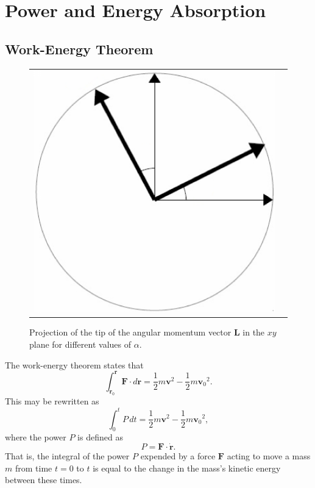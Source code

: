 \documentclass[twocolumn,showpacs,preprintnumbers,amsmath,amssymb]{revtex4}
\begin{document}
\section{Power and Energy Absorption}

\subsection{Work-Energy Theorem}

\begin{figure}
 \centering
 \begin{tabular}{cc}
  \includegraphics[page=6]{rydberg_version2_graphics.pdf}
\end{tabular}
 \label{figur} \caption{Projection of the tip of the angular momentum vector $\mathbf L$ in the $xy$ plane for different values of $\alpha$.}
\end{figure}

The work-energy theorem states that
\begin{equation}
\int_{\mathbf r_0}^{\mathbf r} \mathbf F\cdot d\mathbf r = \frac{1}{2}m{\mathbf v}^2 - \frac{1}{2}m{\mathbf v_0}^2.
\end{equation}
This may be rewritten as
\begin{equation}
\label{eq:int F.v dt}
\int_0^t P\,dt = \frac{1}{2}m{\mathbf v}^2 - \frac{1}{2}m{\mathbf v_0}^2,
\end{equation}
where the power $P$ is defined as
\begin{equation}
P = \mathbf F\cdot\dot{\mathbf r}.
\end{equation}
That is, the integral of the power $P$ expended by a force $\mathbf F$ acting to move a mass $m$ from time $t=0$ to $t$ is equal to the change in the mass's kinetic energy between these times.
\end{document}
